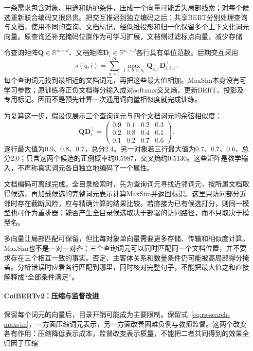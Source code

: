一条需求包含对象、用途和防护条件，压成一个向量可能丢失局部线索；对每个候选重新联合编码又很昂贵。把交互推迟到独立编码之后：共享BERT分别处理查询与文档，使用不同的查询、文档标记，经低维投影和归一化保留多个上下文化词元向量。原查询还补充掩码位置作为可学习扩展，文档侧过滤标点向量，减少存储

令查询矩阵$\bm Q\in\mathbb R^{m\times d}$、文档矩阵$\bm D_i\in\mathbb R^{n_i\times d}$各行具有单位范数。后期交互采用
\begin{equation}
 s(q,i)=\sum_{a=1}^{m}\max_{1\leq b\leq n_i}
             \bm Q_{a,:}\bm D_{i,b,:}^{\top}.
 \label{eq:rs-search-maxsim}
\end{equation}
每个查询词元找到最相近的文档词元，再把这些最大值相加。MaxSim本身没有可学习参数；原训练将正负文档得分输入成对softmax交叉熵，更新BERT、投影及专用标记。因而不是预先计算一次通用词向量相似度就完成训练。

为复算这一步，假设仅展示三个查询词元与四个文档词元的余弦相似度：
\[
 \bm Q\bm D_i^\top=
 \begin{pmatrix}
 0.9&0.1&0.2&0.3\\
 0.2&0.8&0.4&0.1\\
 0.1&0.2&0.7&0.6
 \end{pmatrix}.
\]
逐行最大值为0.9、0.8、0.7，总分2.4。另一对象若三行最大值为0.7、0.7、0.6，总分2.0；只含这两个候选的正例概率约0.5987，交叉熵约0.5130。这些矩阵是教学输入，不声称真实词元各自独立地编码了一个属性。

文档编码可离线完成。全目录检索时，先为查询词元寻找近邻词元，按所属文档取得候选，再加载候选的完整词元表示计算MaxSim并返回标识。这里只访问部分近邻时存在截断风险，应与精确计算的结果比较。若直接为已有候选打分，则同一模型也可作为重排器；能否产生全目录候选取决于部署的访问路径，而不只取决于模型名。

多向量让局部匹配可保留，但比每对象单向量需要更多存储、传输和相似度计算。MaxSim也不是一对一对齐：三个查询词元可以同时匹配同一个文档位置，并不要求存在三个相互一致的事实。否定、主客体关系和数量条件仍可能被高局部得分掩盖。分析错误时应看各行匹配到哪里，同时核对完整句子，不能把最大值之和直接解释成“全部条件满足”。

\Needspace{100mm}
\paragraph{ColBERTv2：压缩与监督改进}
\label{sec:rs-search-colbertv2}

保留每个词元的向量后，目录开销可能成为主要限制。保留式~\eqref{eq:rs-search-maxsim}，一方面压缩词元表示，另一方面改善困难负例与教师监督。这两个改变各有作用：压缩降低表示成本，监督改变表示质量，不能把二者共同得到的效果全归因于压缩

